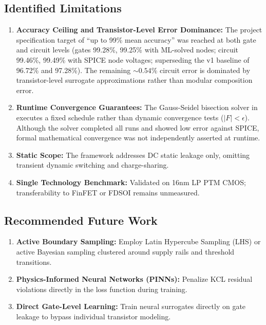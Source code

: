 \documentclass[11pt,a4paper]{article}
\numberwithin{table}{section}
\numberwithin{figure}{section}
\begin{document}
\subsection{Identified Limitations}
\begin{enumerate}[noitemsep]
    \item \textbf{Accuracy Ceiling and Transistor-Level Error Dominance:} The project specification target of ``up to 99\% mean accuracy'' was reached at both gate and circuit levels (gates 99.28\%, 99.25\% with ML-solved nodes; circuit 99.46\%, 99.49\% with SPICE node voltages; superseding the v1 baseline of 96.72\% and 97.28\%). The remaining $\sim 0.54\%$ circuit error is dominated by transistor-level surrogate approximations rather than modular composition error.
    \item \textbf{Runtime Convergence Guarantees:} The Gauss-Seidel bisection solver in  executes a fixed schedule rather than dynamic convergence tests ($|F| < \epsilon$). Although the solver completed all runs and showed low error against SPICE, formal mathematical convergence was not independently asserted at runtime.
    \item \textbf{Static Scope:} The framework addresses DC static leakage only, omitting transient dynamic switching and charge-sharing.
    \item \textbf{Single Technology Benchmark:} Validated on 16nm LP PTM CMOS; transferability to FinFET or FDSOI remains unmeasured.
\end{enumerate}

\subsection{Recommended Future Work}
\begin{enumerate}[noitemsep]
    \item \textbf{Active Boundary Sampling:} Employ Latin Hypercube Sampling (LHS) or active Bayesian sampling clustered around supply rails and threshold transitions.
    \item \textbf{Physics-Informed Neural Networks (PINNs):} Penalize KCL residual violations directly in the loss function during training.
    \item \textbf{Direct Gate-Level Learning:} Train neural surrogates directly on gate leakage to bypass individual transistor modeling.
\end{enumerate}
\end{document}

